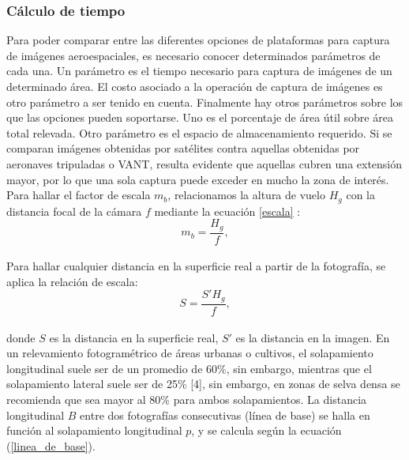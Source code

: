 \subsubsection{Cálculo de tiempo}
Para poder comparar entre las diferentes opciones de plataformas para captura de imágenes aeroespaciales, es necesario conocer determinados parámetros de cada una. Un parámetro es el tiempo necesario para captura de imágenes de un determinado área. El costo asociado a la operación de captura de imágenes es otro parámetro a ser tenido en cuenta. Finalmente hay otros parámetros sobre los que las opciones pueden soportarse. Uno es el porcentaje de área útil sobre área total relevada. Otro parámetro es el espacio de almacenamiento requerido.
Si se comparan imágenes obtenidas por satélites contra aquellas obtenidas por aeronaves tripuladas o VANT, resulta evidente que aquellas cubren una extensión mayor, por lo que una sola captura puede exceder en mucho la zona de interés. 
Para hallar el factor de escala $m_b$, relacionamos la altura de vuelo $H_g$ con la distancia focal
de la cámara $f$ mediante la ecuación \ref{escala} \cite{linder_digital_2016}:
\\
\begin{equation}
	m_b=\frac{H_g}{f},\label{escala}
\end{equation}
\\
Para hallar cualquier distancia en la superficie real a partir de la fotografía, se aplica la relación de escala:
\\
\begin{equation}
	S=\frac{S'H_g}{f},\label{escala1}
\end{equation}
\\
donde $S$ es la distancia en la superficie real, $S'$ es la distancia en la imagen.
En un relevamiento fotogramétrico de áreas urbanas o cultivos, el solapamiento longitudinal suele ser de un promedio de 60\%, sin embargo,  mientras que el solapamiento lateral suele ser de 25\% [4], sin embargo, en zonas de selva densa se recomienda que sea mayor al 80\% para ambos solapamientos. La distancia longitudinal $B$ entre dos fotografías consecutivas (línea de base) se halla en función al solapamiento longitudinal $p$, y se calcula según la ecuación (\ref{linea_de_base}).
